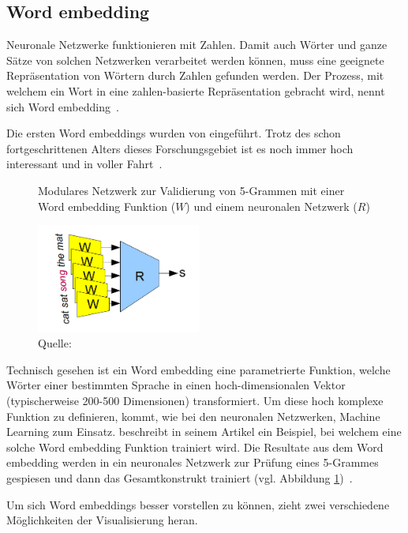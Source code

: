 \subsection{Word embedding}
\label{chap:embedding}

Neuronale Netzwerke funktionieren mit Zahlen. Damit auch Wörter und ganze Sätze von solchen Netzwerken verarbeitet werden können, muss eine geeignete Repräsentation von Wörtern durch Zahlen gefunden werden. Der Prozess, mit welchem ein Wort in eine zahlen-basierte Repräsentation gebracht wird, nennt sich Word embedding~\autocite{Olah2014b}.

Die ersten Word embeddings wurden von \textcite{Bengio2001} eingeführt. Trotz des schon fortgeschrittenen Alters dieses Forschungsgebiet ist es noch immer hoch interessant und in voller Fahrt~\autocite{Olah2014b}.

\begin{figure} 
    \captionsetup{width=.9\linewidth}
    \caption[Modulares Netzwerk zur Validierung von 5-Grammen]{Modulares Netzwerk zur Validierung von 5-Grammen mit einer Word embedding Funktion ($W$) und einem neuronalen Netzwerk ($R$)}
    \label{wordembeddingtraining}
    \centering
    \includegraphics[width=0.48\textwidth]{graphics/wordembeddingtraining.png}
    \caption*{Quelle: \textcite{Olah2014b}}
\end{figure}
Technisch gesehen ist ein Word embedding eine parametrierte Funktion, welche Wörter einer bestimmten Sprache in einen hoch-dimensionalen Vektor (typischerweise 200-500 Dimensionen) transformiert. Um diese hoch komplexe Funktion zu definieren, kommt, wie bei den neuronalen Netzwerken, Machine Learning zum Einsatz. \textcite{Olah2014b} beschreibt in seinem Artikel ein Beispiel, bei welchem eine solche Word embedding Funktion trainiert wird. Die Resultate aus dem Word embedding werden in ein neuronales Netzwerk zur Prüfung eines 5-Grammes gespiesen und dann das Gesamtkonstrukt trainiert (vgl. Abbildung \ref{wordembeddingtraining})~\autocite{Olah2014b}.

Um sich Word embeddings besser vorstellen zu können, zieht \textcite{Olah2014b} zwei verschiedene Möglichkeiten der Visualisierung heran.

